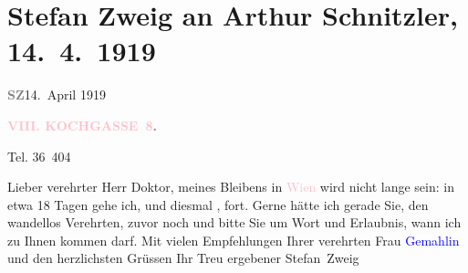 

\renewcommand{\erwaehntePersonen}{Personen: Olga Schnitzler, Stefan Zweig}
\renewcommand{\erwaehnteOrte}{Orte: Kochgasse 8, Paschinger Schlössl, Salzburg, Wien}
\renewcommand{\erwaehnteWerke}{}
\section[Stefan Zweig an Arthur Schnitzler, 14. 4. 1919]{Stefan Zweig an Arthur Schnitzler, 14. 4. 1919}
\nopagebreak{}
\rehead{ }\normalsize\beginnumbering{}
\toendnotes[C]{\smallbreak\pagebreak[2]}
\toendnotes[C]{\smallbreak}
\pstart
           {\pb}\textcolor{gray}{\textbf{SZ}}\hfill 14. April 1919\pend
           
\pstart
           \raggedleft{}\textcolor{gray}{\textbf{\textcolor{pink}{VIII. KOCHGASSE 8}{}\ledrightnote{\textcolor{pink}{Kochgasse 8}}.}}\pend
           
\pstart
           \raggedleft{}Tel. 36 404\pend
           
\pstart
           Lieber verehrter Herr Doktor, meines Bleibens in \textcolor{pink}{Wien}{}\ledrightnote{\textcolor{pink}{Wien}} wird nicht lange sein: in etwa 18 Tagen gehe ich, und
               diesmal \label{K_L03664-1v}\label{K_L03664-1h}, fort. Gerne hätte ich gerade Sie, den
               wandellos Verehrten, zuvor noch \label{K_L03664-2v}\label{K_L03664-2h} und bitte Sie um Wort und Erlaubnis, wann ich zu Ihnen kommen darf.
               Mit vielen Empfehlungen Ihrer verehrten Frau \textcolor{blue}{Gemahlin}{}\ledrightnote{{$\rightarrow$}\textcolor{blue}{Olga Schnitzler}} und den herzlichsten Grüssen Ihr Treu ergebener \pend
           \pstart \spacefill\mbox{Stefan Zweig}\pend{}\endnumbering{}
\begin{anhang}
\end{anhang}
      